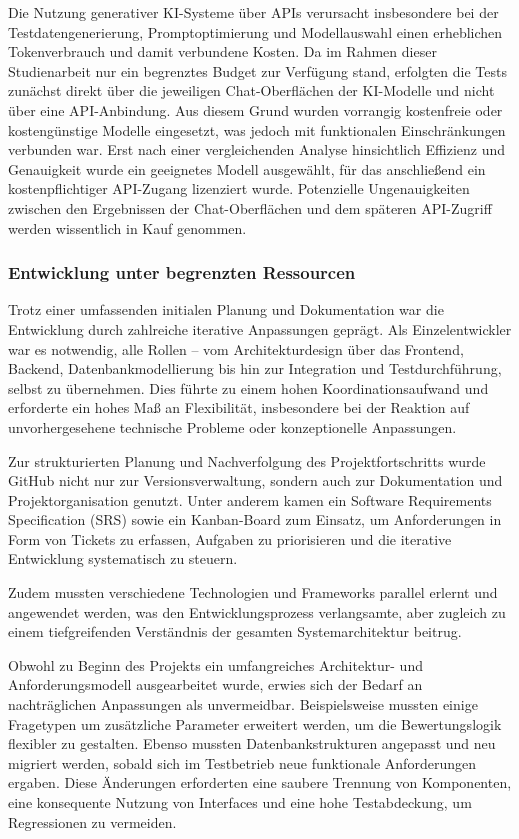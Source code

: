 \documentclass[a4paper,12pt]{article}
\begin{document}
Die Nutzung generativer KI-Systeme über APIs verursacht insbesondere bei der Testdatengenerierung, Promptoptimierung und Modellauswahl einen erheblichen Tokenverbrauch und damit verbundene Kosten. Da im Rahmen dieser Studienarbeit nur ein begrenztes Budget zur Verfügung stand, erfolgten die Tests zunächst direkt über die jeweiligen Chat-Oberflächen der KI-Modelle und nicht über eine API-Anbindung. Aus diesem Grund wurden vorrangig kostenfreie oder kostengünstige Modelle eingesetzt, was jedoch mit funktionalen Einschränkungen verbunden war. Erst nach einer vergleichenden Analyse hinsichtlich Effizienz und Genauigkeit wurde ein geeignetes Modell ausgewählt, für das anschließend ein kostenpflichtiger API-Zugang lizenziert wurde. Potenzielle Ungenauigkeiten zwischen den Ergebnissen der Chat-Oberflächen und dem späteren API-Zugriff werden wissentlich in Kauf genommen.

\subsubsection{Entwicklung unter begrenzten Ressourcen}

Trotz einer umfassenden initialen Planung und Dokumentation war die Entwicklung durch zahlreiche iterative Anpassungen geprägt. Als Einzelentwickler war es notwendig, alle Rollen – vom Architekturdesign über das Frontend, Backend, Datenbankmodellierung bis hin zur Integration und Testdurchführung, selbst zu übernehmen. Dies führte zu einem hohen Koordinationsaufwand und erforderte ein hohes Maß an Flexibilität, insbesondere bei der Reaktion auf unvorhergesehene technische Probleme oder konzeptionelle Anpassungen.

Zur strukturierten Planung und Nachverfolgung des Projektfortschritts wurde GitHub nicht nur zur Versionsverwaltung, sondern auch zur Dokumentation und Projektorganisation genutzt. Unter anderem kamen ein Software Requirements Specification (SRS) sowie ein Kanban-Board zum Einsatz, um Anforderungen in Form von Tickets zu erfassen, Aufgaben zu priorisieren und die iterative Entwicklung systematisch zu steuern.

Zudem mussten verschiedene Technologien und Frameworks parallel erlernt und angewendet werden, was den Entwicklungsprozess verlangsamte, aber zugleich zu einem tiefgreifenden Verständnis der gesamten Systemarchitektur beitrug.

Obwohl zu Beginn des Projekts ein umfangreiches Architektur- und Anforderungsmodell ausgearbeitet wurde, erwies sich der Bedarf an nachträglichen Anpassungen als unvermeidbar. Beispielsweise mussten einige Fragetypen um zusätzliche Parameter erweitert werden, um die Bewertungslogik flexibler zu gestalten. Ebenso mussten Datenbankstrukturen angepasst und neu migriert werden, sobald sich im Testbetrieb neue funktionale Anforderungen ergaben. Diese Änderungen erforderten eine saubere Trennung von Komponenten, eine konsequente Nutzung von Interfaces und eine hohe Testabdeckung, um Regressionen zu vermeiden.
\end{document}
